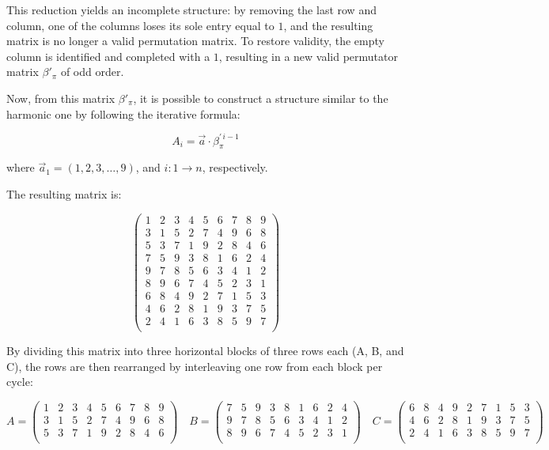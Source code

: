 \documentclass{article}
\begin{document}
\medskip

This reduction yields an incomplete structure: by removing the last row and column, one of the columns loses its sole entry equal to \(1\), and the resulting matrix is no longer a valid permutation matrix. To restore validity, the empty column is identified and completed with a \(1\), resulting in a new valid permutator matrix \(\beta'_\pi\) of odd order.

\medskip

Now, from this matrix \(\beta'_\pi\), it is possible to construct a structure similar to the harmonic one by following the iterative formula:

\[
A_i = \vec{a} \cdot \beta_\pi^{'\,i-1}
\]

where \(\vec{a}_1 = (1, 2, 3, \dots, 9)\), and \(i : 1 \longrightarrow n\), respectively.


\medskip

The resulting matrix is:

\[
\begin{pmatrix}
1 & 2 & 3 & 4 & 5 & 6 & 7 & 8 & 9 \\
3 & 1 & 5 & 2 & 7 & 4 & 9 & 6 & 8 \\
5 & 3 & 7 & 1 & 9 & 2 & 8 & 4 & 6 \\
7 & 5 & 9 & 3 & 8 & 1 & 6 & 2 & 4 \\
9 & 7 & 8 & 5 & 6 & 3 & 4 & 1 & 2 \\
8 & 9 & 6 & 7 & 4 & 5 & 2 & 3 & 1 \\
6 & 8 & 4 & 9 & 2 & 7 & 1 & 5 & 3 \\
4 & 6 & 2 & 8 & 1 & 9 & 3 & 7 & 5 \\
2 & 4 & 1 & 6 & 3 & 8 & 5 & 9 & 7 \\
\end{pmatrix}
\]

\medskip

By dividing this matrix into three horizontal blocks of three rows each (A, B, and C), the rows are then rearranged by interleaving one row from each block per cycle:

\[
A =
\begin{pmatrix}
1 & 2 & 3 & 4 & 5 & 6 & 7 & 8 & 9 \\
3 & 1 & 5 & 2 & 7 & 4 & 9 & 6 & 8 \\
5 & 3 & 7 & 1 & 9 & 2 & 8 & 4 & 6 \\
\end{pmatrix}
\quad
B =
\begin{pmatrix}
7 & 5 & 9 & 3 & 8 & 1 & 6 & 2 & 4 \\
9 & 7 & 8 & 5 & 6 & 3 & 4 & 1 & 2 \\
8 & 9 & 6 & 7 & 4 & 5 & 2 & 3 & 1 \\
\end{pmatrix}
\quad
C =
\begin{pmatrix}
6 & 8 & 4 & 9 & 2 & 7 & 1 & 5 & 3 \\
4 & 6 & 2 & 8 & 1 & 9 & 3 & 7 & 5 \\
2 & 4 & 1 & 6 & 3 & 8 & 5 & 9 & 7 \\
\end{pmatrix}
\]
\end{document}
